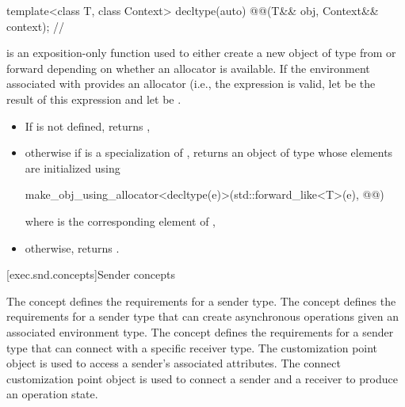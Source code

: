 \begin{itemdecl}
template<class T, class Context>
  decltype(auto) @@(T&& obj, Context&& context);       // \expos
\end{itemdecl}

\begin{itemdescr}
\pnum
{} is an exposition-only function used to
either create a new object of type  from 
or forward  depending on whether an allocator is available.
If the environment associated with  provides an allocator
(i.e., the expression  is valid,
let  be the result of this expression
and let  be .

\pnum
\returns
\begin{itemize}
\item
If  is not defined, returns ,
\item
otherwise if  is a specialization of ,
returns an object of type  whose elements are initialized using
\begin{codeblock}
make_obj_using_allocator<decltype(e)>(std::forward_like<T>(e), @@)
\end{codeblock}
where  is the corresponding element of ,
\item
otherwise, returns .
\end{itemize}
\end{itemdescr}

[exec.snd.concepts]{Sender concepts}

\pnum
The  concept defines
the requirements for a sender type.
The  concept defines
the requirements for a sender type
that can create asynchronous operations given an associated environment type.
The  concept defines
the requirements for a sender type
that can connect with a specific receiver type.
The  customization point object is used to access
a sender's associated attributes.
The connect customization point object is used to connect
a sender and a receiver to produce an operation state.

